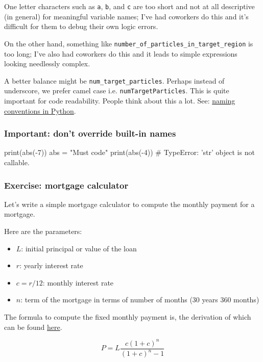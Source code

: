 \documentclass[12pt,letterpaper,twoside]{article}
\begin{document}
One letter characters such as \texttt{a}, \texttt{b}, and \texttt{c}
are too short and not at all descriptive (in general) for meaningful
variable names; I've had coworkers do this and it's difficult for them
to debug their own logic errors. 

On the other hand, something like
\texttt{number\_of\_particles\_in\_target\_region} is too long; I've
also had coworkers do this and it leads to simple expressions looking
needlessly complex. 

A better balance might be
\texttt{num\_target\_particles}. Perhaps instead of underscore, we
prefer camel case i.e. \texttt{numTargetParticles}.
This is quite important for code readability. People think about this a
lot. See:
\href{https://www.python.org/dev/peps/pep-0008/\#naming-conventions}
{naming conventions in Python}.

\subsubsection{Important: don't override built-in names}

\begin{python}
print(abs(-7))
abs = "Must code"
print(abs(-4))      # TypeError: 'str' object is not callable.
\end{python}

\subsubsection{Exercise: mortgage calculator}

Let's write a simple mortgage calculator to compute the monthly payment
for a mortgage.

Here are the parameters:

\begin{itemize}
\item $L$: initial principal or value of the loan
\item $r$: yearly interest rate
\item $c = r/12$: monthly interest rate
\item $n$: term of the mortgage in terms of number of months (30 years
  360 months)
\end{itemize}

The formula to compute the fixed monthly payment is, the derivation of which can be found \href{https://en.wikipedia.org/wiki/Mortgage_calculator#Monthly_payment_formula}{here}.

\[
P = L \frac{c(1+c)^n}{(1+c)^n-1}
\]
\end{document}
